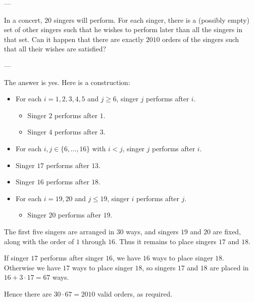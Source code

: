 
---

In a concert, $20$ singers will perform. For each singer, there is a (possibly empty) set of other singers such that he wishes to perform later than all the singers in that set. Can it happen that there are exactly $2010$ orders of the singers such that all their wishes are satisfied?

---

The answer is yes. Here is a construction:
\begin{itemize}[itemsep=0em]
    \item For each $i=1,2,3,4,5$ and $j\ge6$, singer $j$ performs after $i$.
        \begin{itemize}[itemsep=0em]
            \item Singer $2$ performs after $1$.
            \item Singer $4$ performs after $3$.
        \end{itemize}
    \item For each $i,j\in\{6,\ldots,16\}$ with $i<j$, singer $j$ performs after $i$.
    \item Singer $17$ performs after $13$.
    \item Singer $16$ performs after $18$.
    \item For each $i=19,20$ and $j\le19$, singer $i$ performs after $j$.
        \begin{itemize}
            \item Singer $20$ performs after $19$.
        \end{itemize}
\end{itemize}
The first five singers are arranged in $30$ ways, and singers $19$ and $20$ are fixed, along with the order of $1$ through $16$. Thus it remains to place singers $17$ and $18$.

If singer $17$ performs after singer $16$, we have $16$ ways to place singer $18$. Otherwise we have $17$ ways to place singer $18$, so singers $17$ and $18$ are placed in $16+3\cdot17=67$ ways.

Hence there are $30\cdot67=2010$ valid orders, as required.

